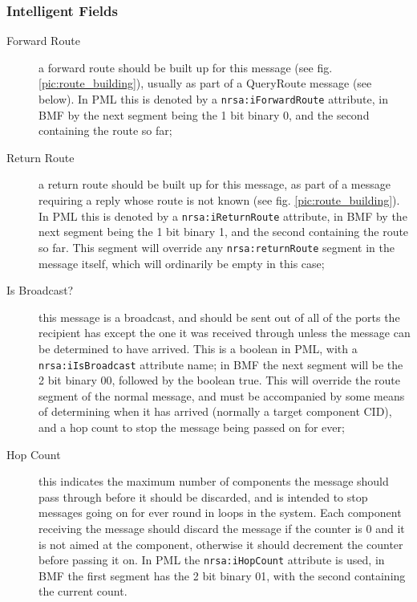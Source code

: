 \documentclass[pdftex,a4paper]{article}
\newcommand{\XMLfont}[1]{{\tt \small #1}}
\begin{document}
\subsubsection{Intelligent Fields}

\begin{description}

\item[Forward Route] a forward route should be built up for this message
  (see fig. \ref{pic:route_building}), usually as part of a QueryRoute
  message (see below). In PML this is denoted by a
  \XMLfont{nrsa:iForwardRoute} attribute, in BMF by the next segment
  being the 1 bit binary 0, and the second containing the route so far;

\item[Return Route] a return route should be built up for this message,
  as part of a message requiring a reply whose route is not known (see
  fig. \ref{pic:route_building}). In PML this is denoted by a
  \XMLfont{nrsa:iReturnRoute} attribute, in BMF by the next segment
  being the 1 bit binary 1, and the second containing the route so
  far. This segment will override any \XMLfont{nrsa:returnRoute} segment
  in the message itself, which will ordinarily be empty in this case;

\item[Is Broadcast?] this message is a broadcast, and should be sent
  out of all of the ports the recipient has except the one it was
  received through unless the message can be determined to have
  arrived. This is a boolean in PML, with a \XMLfont{nrsa:iIsBroadcast}
  attribute name; in BMF the next segment will be the 2 bit binary 00,
  followed by the boolean true. This will override the route segment
  of the normal message, and must be accompanied by some means of
  determining when it has arrived (normally a target component CID),
  and a hop count to stop the message being passed on for ever;

\item[Hop Count] this indicates the maximum number of components the
  message should pass through before it should be discarded, and is
  intended to stop messages going on for ever round in loops in the
  system. Each component receiving the message should discard the
  message if the counter is 0 and it is not aimed at the component,
  otherwise it should decrement the counter before passing it on. In
  PML the \XMLfont{nrsa:iHopCount} attribute is used, in BMF the first
  segment has the 2 bit binary 01, with the second containing the
  current count.


\end{description}
\end{document}
